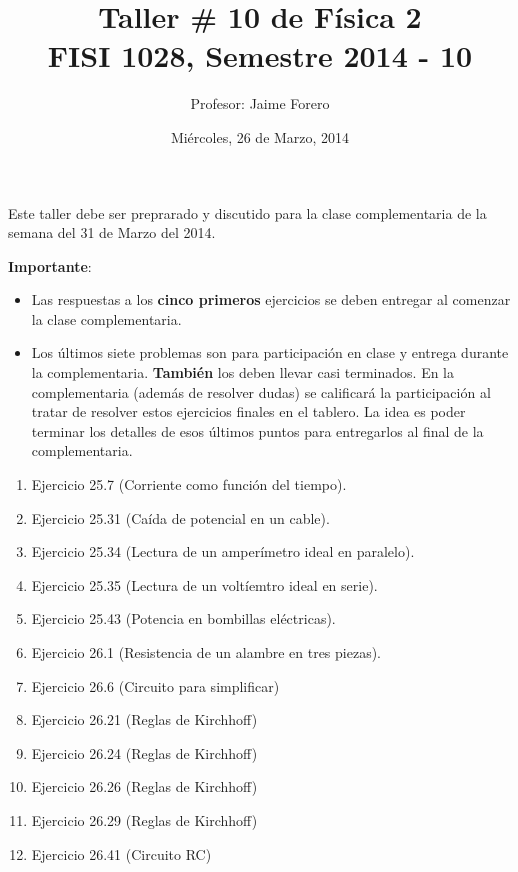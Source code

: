 \documentclass{article}
\title{Taller \# 10 de F\'isica 2\\ FISI 1028, Semestre 2014 - 10}
\author{Profesor: Jaime Forero}
\date{Mi\'ercoles, 26 de Marzo, 2014}
\begin{document}
\maketitle
\thispagestyle{empty}

\noindent

Este taller debe ser preprarado y discutido para la clase
complementaria de la semana del 31 de Marzo del 2014. 

\noindent
{\bf Importante}:
\begin{itemize}

\item
Las respuestas a los {\bf cinco primeros} ejercicios se deben entregar
al comenzar la clase complementaria. 
\item 

Los \'ultimos siete problemas son para participaci\'on en clase y entrega
durante la complementaria. {\bf{Tambi\'en}} los deben llevar casi
terminados. En la complementaria (adem\'as de resolver dudas) se
calificar\'a la participaci\'on al tratar de resolver estos ejercicios
finales en el tablero. La idea es poder terminar los  detalles de esos
\'ultimos puntos para entregarlos al final de la complementaria.
\end{itemize}

\begin{enumerate}

\item
Ejercicio 25.7 (Corriente como funci\'on del tiempo).

\item
Ejercicio 25.31 (Ca\'ida de potencial en un cable).

\item 
Ejercicio 25.34 (Lectura de un amper\'imetro ideal en paralelo).

\item 
Ejercicio 25.35 (Lectura de un volt\'iemtro ideal en serie).

\item 
Ejercicio 25.43 (Potencia en bombillas el\'ectricas).

\item
Ejercicio 26.1 (Resistencia de un alambre en tres piezas).

\item 
Ejercicio 26.6 (Circuito para simplificar)

\item
Ejercicio 26.21 (Reglas de Kirchhoff)

\item
Ejercicio 26.24 (Reglas de Kirchhoff)

\item
Ejercicio 26.26 (Reglas de Kirchhoff)

\item
Ejercicio 26.29 (Reglas de Kirchhoff)

\item 
Ejercicio 26.41 (Circuito RC)

\end{enumerate}
\end{document}
